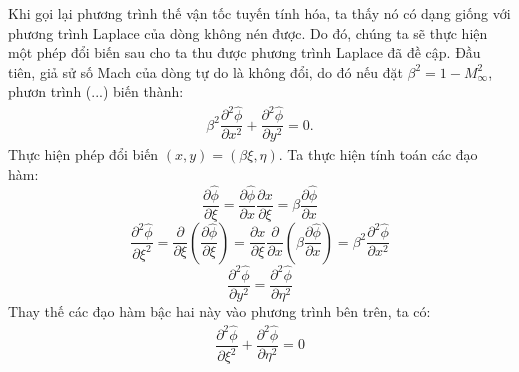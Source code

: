 \documentclass[../../main.tex]{subfiles}
\begin{document}
Khi gọi lại phương trình thế vận tốc tuyến tính hóa, ta thấy nó có dạng giống với phương trình Laplace của dòng không nén được. Do đó, chúng ta sẽ thực hiện một phép đổi biến sau cho ta thu được phương trình Laplace đã đề cập. Đầu tiên, giả sử số Mach của dòng tự do là không đổi, do đó nếu đặt $\beta^2=1-M_\infty^2$, phươn trình (...) biến thành:
	\begin{align}
		\beta^2\dfrac{\partial^2\widehat{\phi}}{\partial x^2}+\dfrac{\partial^2\widehat{\phi}}{\partial y^2}=0.
	\end{align}
Thực hiện phép đổi biến $(x,y)=(\beta\xi,\eta)$. Ta thực hiện tính toán các đạo hàm:
	\[
		\dfrac{\partial\widehat{\phi}}{\partial\xi}=\dfrac{\partial\widehat{\phi}}{\partial x}\dfrac{\partial x}{\partial\xi}=\beta\dfrac{\partial\widehat{\phi}}{\partial x}
	\]
	\[
		\dfrac{\partial^2\widehat{\phi}}{\partial\xi^2}=\dfrac{\partial}{\partial\xi}\left(\dfrac{\partial\widehat{\phi}}{\partial\xi}\right)=\dfrac{\partial x}{\partial\xi}\dfrac{\partial}{\partial x}\left(\beta\dfrac{\partial\widehat{\phi}}{\partial x}\right)=\beta^2\dfrac{\partial^2\widehat{\phi}}{\partial x^2}
	\]
	\[
		\dfrac{\partial^2\widehat{\phi}}{\partial y^2}=\dfrac{\partial^2\widehat{\phi}}{\partial\eta^2}	
	\]
	Thay thế các đạo hàm bậc hai này vào phương trình bên trên, ta có:
	\begin{align}
		\dfrac{\partial^2\widehat{\phi}}{\partial\xi^2}+\dfrac{\partial^2\widehat{\phi}}{\partial\eta^2}=0
	\end{align}
\end{document}
